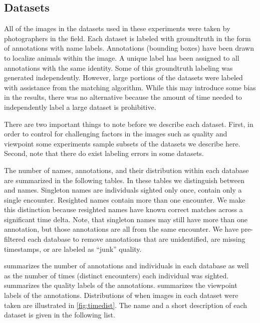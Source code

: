     \subsection{Datasets}\label{sub:datasets}

        All of the images in the datasets used in these experiments were taken by photographers in the field. Each
        dataset is labeled with groundtruth in the form of annotations with name labels. Annotations (bounding
        boxes) have been drawn to localize animals within the image. A unique \name{} label has been assigned to
        all annotations with the same identity. Some of this groundtruth labeling was generated independently.
        However, large portions of the datasets were labeled with assistance from the matching algorithm. While
        this may introduce some bias in the results, there was no alternative because the amount of time needed to
        independently label a large dataset is prohibitive.

        There are two important things to note before we describe each dataset. First, in order to control for
        challenging factors in the images such as quality and viewpoint some experiments sample subsets of the
        datasets we describe here. Second, note that there do exist labeling errors in some datasets.

        \DatabaseInfo{}

        \timedist{}

        The number of names, annotations, and their distribution within each database are summarized in the
        following tables. In these tables we distinguish between  and 
        names. Singleton names are individuals sighted only once, \ie{} contain only a single encounter. Resighted
        names contain more than one encounter. We make this distinction because resighted names have known correct
        matches across a significant time delta. Note, that singleton names may still have more than one
        annotation, but those annotations are all from the same encounter. We have pre-filtered each database to
        remove annotations that are unidentified, are missing timestamps, or are labeled as ``junk'' quality.

         summarizes the number of annotations and individuals in each database as
          well as the number of times (distinct encounters) each individual was sighted.
         summarizes the quality labels of the annotations.
         summarizes the viewpoint labels of the annotations.
        Distributions of when images in each dataset were taken are illustrated in \cref{fig:timedist}.
        The name and a short description of each dataset is given in the following list.


